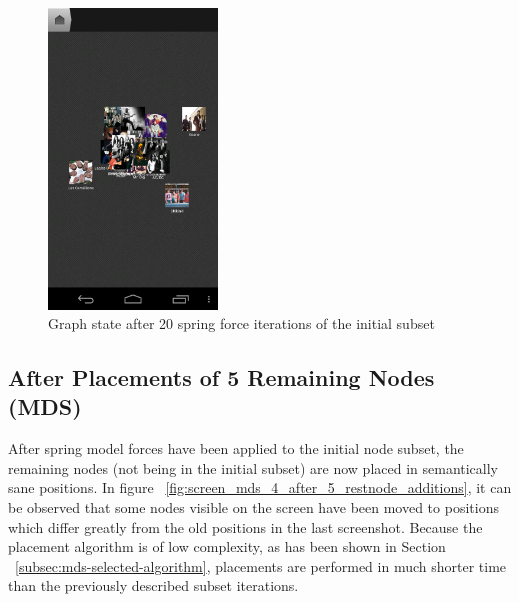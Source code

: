 \begin{figure}[H]
  \centering
    \includegraphics[width=0.4\textwidth]{figures/screen_mds_3_after_20_subset_iterations}
  \caption{Graph state after 20 spring force iterations of the initial subset}
  \label{fig:screen_mds_3_after_20_subset_iterations}
\end{figure}

\newpage
\subsection{After Placements of 5 Remaining Nodes (MDS)}

After spring model forces have been applied to the initial node subset, the remaining nodes (not being in the initial subset) are now placed in semantically sane positions. In figure ~\ref{fig:screen_mds_4_after_5_restnode_additions}, it can be observed that some nodes visible on the screen have been moved to positions which differ greatly from the old positions in the last screenshot. Because the placement algorithm is of low complexity, as has been shown in Section ~\ref{subsec:mds-selected-algorithm}, placements are performed in much shorter time than the previously described subset iterations.

